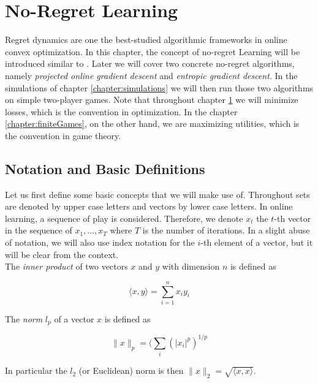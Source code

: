 
\chapter{No-Regret Learning}\label{chapter:noRegretLearning}

Regret dynamics are one the best-studied algorithmic frameworks in online convex optimization. In this chapter, the concept of no-regret Learning will be introduced similar to \cite[Chapter 2]{HDRmertikopoulos}. Later we will cover two concrete no-regret algorithms, namely \textit{projected online gradient descent} and \textit{entropic gradient descent}. In the simulations of chapter \ref{chapter:simulations} we will then run those two algorithms on simple two-player games. Note that throughout chapter \ref{chapter:noRegretLearning} we will minimize losses, which is the convention in optimization. In the chapter \ref{chapter:finiteGames}, on the other hand, we are maximizing utilities, which is the convention in game theory.


\section{Notation and Basic Definitions}\label{section:notationAndDefinitionsRegret}

Let us first define some basic concepts that we will make use of. Throughout sets are denoted by upper case letters and vectors by lower case letters. In online learning, a sequence of play is considered. Therefore, we denote $x_t$ the $t$-th vector in the sequence of $x_1, \dots, x_T$ where $T$ is the number of iterations. In a slight abuse of notation, we will also use index notation for the $i$-th element of a vector, but it will be clear from the context. \\

The \textit{inner product} of two vectors $x$ and $y$ with dimension $n$ is defined as 

\begin{equation*}
    \langle x,y\rangle = \sum_{i=1}^{n}x_i y_i
\end{equation*}

The \textit{norm} $l_p$ of a vector $x$ is defined as

\begin{equation*}
    \|x\|_p = (\sum_{i}(|x_i|^p)^{1/p}
\end{equation*}

In particular the $l_2$ (or Euclidean) norm is then $\|x\|_2 = \sqrt{\langle x,x\rangle}$. \\

